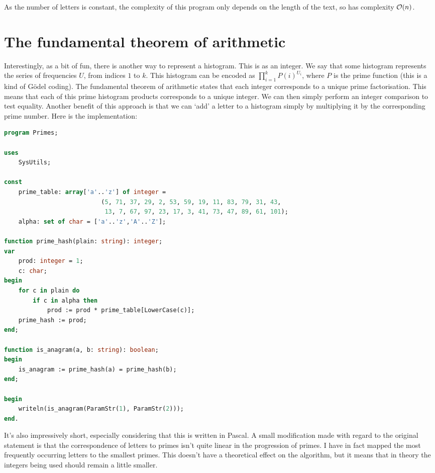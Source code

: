 \documentclass[fleqn,a4paper,11pt]{article}
\begin{document}
    As the number of letters is constant, the complexity of this program only
    depends on the length of the text, so has complexity \(\operatorname{\mathcal O}(n)\).

    \section{The fundamental theorem of arithmetic}

    Interestingly, as a bit of fun, there is another way to represent a
    histogram. This is as an integer. We say that some histogram represents the
    series of frequencies \(U\), from indices \(1\) to \(k\).  This histogram
    can be encoded as
    \(\prod\limits_{i=1}^{k} P(i)^{U_i}\),
    where \(P\) is the prime function (this is a kind of G\"odel coding). The
    fundamental theorem of arithmetic states that each integer corresponds to a
    unique prime factorisation. This means that each of this prime histogram
    products corresponds to a unique integer. We can then simply perform an
    integer comparison to test equality.  Another benefit of this approach is
    that we can `add' a letter to a histogram simply by multiplying it by the
    corresponding prime number. Here is the implementation:

\begin{lstlisting}[language=Pascal, caption=Prime-number anagram checking in Pascal]
program Primes;

uses
    SysUtils;

const
    prime_table: array['a'..'z'] of integer =
                           (5, 71, 37, 29, 2, 53, 59, 19, 11, 83, 79, 31, 43,
                            13, 7, 67, 97, 23, 17, 3, 41, 73, 47, 89, 61, 101);
    alpha: set of char = ['a'..'z','A'..'Z'];

function prime_hash(plain: string): integer;
var
    prod: integer = 1;
    c: char;
begin
    for c in plain do
        if c in alpha then
            prod := prod * prime_table[LowerCase(c)];
    prime_hash := prod;
end;

function is_anagram(a, b: string): boolean;
begin
    is_anagram := prime_hash(a) = prime_hash(b);
end;

begin
    writeln(is_anagram(ParamStr(1), ParamStr(2)));
end.
\end{lstlisting}

    It's also impressively short, especially considering that this is written in
    Pascal. A small modification made with regard to the original statement is
    that the correspondence of letters to primes isn't quite linear in the
    progression of primes. I have in fact mapped the most frequently occurring
    letters to the smallest primes. This doesn't have a theoretical effect on
    the algorithm, but it means that in theory the integers being used should
    remain a little smaller.
\end{document}
